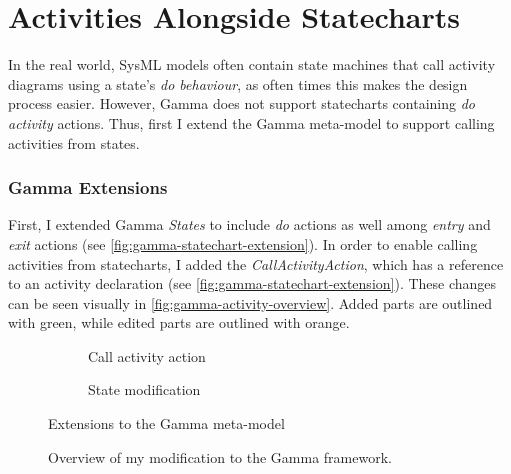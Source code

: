 \section{Activities Alongside Statecharts}\label{sec:activities-alongside-statecharts}

In the real world, SysML models often contain state machines that call activity diagrams using a state's \emph{do behaviour}, as often times this makes the design process easier. However, Gamma does not support statecharts containing \emph{do activity} actions. Thus, first I extend the Gamma meta-model to support calling activities from states.

\subsubsection{Gamma Extensions}

First, I extended Gamma \emph{States} to include \emph{do} actions as well among \emph{entry} and \emph{exit} actions (see \autoref{fig:gamma-statechart-extension}). In order to enable calling activities from statecharts, I added the \emph{CallActivityAction}, which has a reference to an activity declaration (see \autoref{fig:gamma-statechart-extension}). These changes can be seen visually in \autoref{fig:gamma-activity-overview}. Added parts are outlined with green, while edited parts are outlined with orange.

\begin{figure}[!ht]
	\begin{subfigure}{.5\textwidth}
		\centering
		
		\caption{Call activity action}
		\label{fig:gamma-activity-extension}
	\end{subfigure}%
	\begin{subfigure}{.5\textwidth}
		\centering
		
		\caption{State modification}
		\label{fig:gamma-statechart-extension}
	\end{subfigure}
	\caption{Extensions to the Gamma meta-model}
	\label{fig:gamma-extension}
\end{figure}

\begin{figure}[!ht]
	\centering
	
	\caption{Overview of my modification to the Gamma framework.}
	\label{fig:gamma-activity-overview}
\end{figure}

